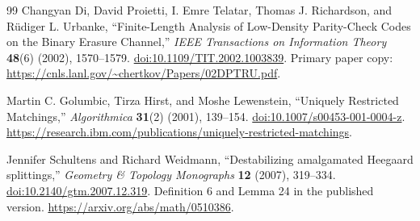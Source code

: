 \begin{thebibliography}{99}
Changyan Di, David Proietti, I. Emre Telatar, Thomas J. Richardson,
and R{\"u}diger L. Urbanke,
``Finite-Length Analysis of Low-Density Parity-Check Codes on the Binary
Erasure Channel,''
\emph{IEEE Transactions on Information Theory} \textbf{48}(6)
(2002), 1570--1579.
\href{https://doi.org/10.1109/TIT.2002.1003839}{doi:10.1109/TIT.2002.1003839}.
Primary paper copy:
\url{https://cnls.lanl.gov/~chertkov/Papers/02DPTRU.pdf}.

Martin C. Golumbic, Tirza Hirst, and Moshe Lewenstein,
``Uniquely Restricted Matchings,''
\emph{Algorithmica} \textbf{31}(2) (2001), 139--154.
\href{https://doi.org/10.1007/s00453-001-0004-z}{doi:10.1007/s00453-001-0004-z}.
\url{https://research.ibm.com/publications/uniquely-restricted-matchings}.

Jennifer Schultens and Richard Weidmann,
``Destabilizing amalgamated Heegaard splittings,''
\emph{Geometry \& Topology Monographs} \textbf{12} (2007), 319--334.
\href{https://doi.org/10.2140/gtm.2007.12.319}{doi:10.2140/gtm.2007.12.319}.
Definition 6 and Lemma 24 in the published version.
\url{https://arxiv.org/abs/math/0510386}.

\end{thebibliography}
